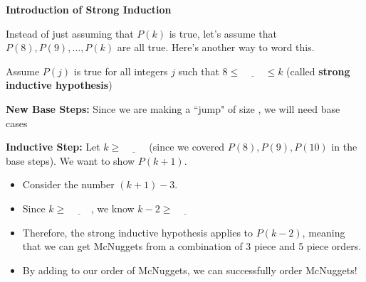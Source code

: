 \documentclass[fleqn]{article}
\theoremstyle{definition}
\begin{document}
\vspace{1cm}
\textbf{Introduction of Strong Induction}

\vspace{.25cm}
Instead of just assuming that $P(k)$ is true, let's assume that $P(8), P(9), \ldots , P(k)$ are all true. Here's another way to word this. 

\vspace{.25cm}
Assume $P(j)$ is true for all integers $j$ such that $8 \leq \underline{\hspace{1cm}} \leq k$ \hspace{.5cm} (called \textbf{strong inductive hypothesis})

\vspace{.5cm}
\textbf{New Base Steps:} Since we are making a ``jump" of size \underline{\hspace{1cm}}, we will need \underline{\hspace{1cm}} base cases

\vspace{3cm}
\textbf{Inductive Step:} Let $k \geq \underline{\hspace{1cm}}$ (since we covered $P(8), P(9), P(10)$ in the base steps). We want to show $P(k+1)$.

    \vspace{.25cm}
    \begin{itemize}
        \item Consider the number $(k+1)-3$.

        \vspace{.25cm}
        \item Since $k \geq \underline{\hspace{1cm}}$, we know $k-2 \geq \underline{\hspace{1cm}}$

        \vspace{.25cm}
        \item Therefore, the strong inductive hypothesis applies to $P(k-2)$, meaning that we can get \underline{\hspace{1.5cm}} McNuggets from a combination of 3 piece and 5 piece orders. 

        \vspace{.25cm}
        \item By adding \underline{\hspace{4cm}} to our order of \underline{\hspace{1.5cm}} McNuggets, we can successfully order \underline{\hspace{1.5cm}} McNuggets!
    \end{itemize}
\end{document}
